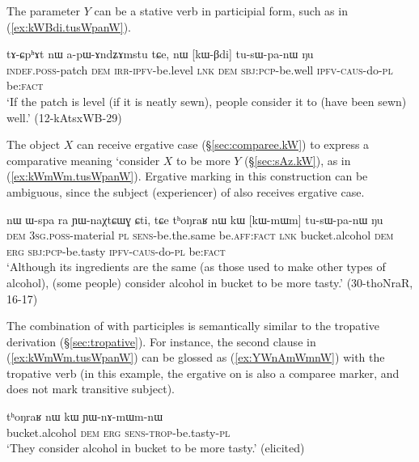 The parameter $Y$ can be a stative verb in participial form, such as  in (\ref{ex:kWBdi.tusWpanW}).

\begin{exe}
\ex \label{ex:kWBdi.tusWpanW}
\gll tɤ-ɕpʰɤt nɯ a-pɯ-ɤndʑɤmstu tɕe, nɯ [kɯ-βdi] tu-sɯ-pa-nɯ ŋu \\
\textsc{indef}.\textsc{poss}-patch \textsc{dem} \textsc{irr}-\textsc{ipfv}-be.level \textsc{lnk} \textsc{dem} \textsc{sbj}:\textsc{pcp}-be.well \textsc{ipfv}-\textsc{caus}-do-\textsc{pl} be:\textsc{fact} \\
\glt `If the patch is level (if it is neatly sewn), people consider it to (have been sewn) well.' (12-kAtsxWB-29)
\end{exe}


The object $X$ can receive ergative case (§\ref{sec:comparee.kW}) to express a comparative meaning `consider $X$ to be more $Y$ (§\ref{sec:sAz.kW}), as in (\ref{ex:kWmWm.tusWpanW}). Ergative marking in this construction can be ambiguous, since the subject (experiencer) of  also receives ergative case.

\begin{exe}
\ex \label{ex:kWmWm.tusWpanW}
\gll nɯ ɯ-spa ra ɲɯ-naχtɕɯɣ ɕti, tɕe tʰoŋraʁ nɯ kɯ [kɯ-mɯm] tu-sɯ-pa-nɯ ŋu \\
\textsc{dem} \textsc{3sg}.\textsc{poss}-material \textsc{pl} \textsc{sens}-be.the.same be.\textsc{aff}:\textsc{fact} \textsc{lnk} bucket.alcohol \textsc{dem} \textsc{erg} \textsc{sbj}:\textsc{pcp}-be.tasty \textsc{ipfv}-\textsc{caus}-do-\textsc{pl} be:\textsc{fact} \\
\glt `Although its ingredients are the same (as those used to make other types of alcohol), (some people) consider alcohol in bucket to be more tasty.' (30-thoNraR, 16-17)
\end{exe}

The combination of  with participles is semantically similar to the tropative  derivation (§\ref{sec:tropative}). For instance, the second clause in (\ref{ex:kWmWm.tusWpanW}) can be glossed as (\ref{ex:YWnAmWmnW}) with the tropative verb  (in this example, the ergative on  is also a comparee marker, and does not mark transitive subject).

\begin{exe}
\ex \label{ex:YWnAmWmnW}
\gll tʰoŋraʁ nɯ kɯ ɲɯ-nɤ-mɯm-nɯ \\
bucket.alcohol \textsc{dem} \textsc{erg} \textsc{sens}-\textsc{trop}-be.tasty-\textsc{pl} \\
\glt `They consider alcohol in bucket to be more tasty.' (elicited)
\end{exe}


